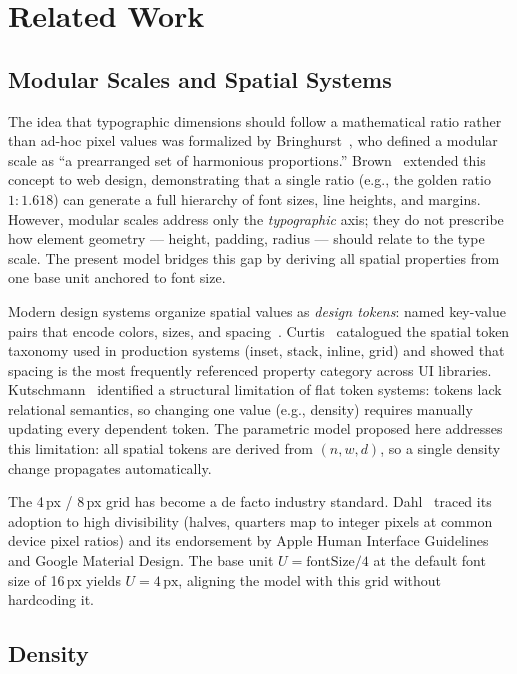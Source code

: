 \section{Related Work}
\label{sec:related-work}

\subsection{Modular Scales and Spatial Systems}

The idea that typographic dimensions should follow a mathematical ratio rather than ad-hoc pixel values was formalized by Bringhurst~\cite{bringhurst2012}, who defined a modular scale as ``a prearranged set of harmonious proportions.'' Brown~\cite{brown2011} extended this concept to web design, demonstrating that a single ratio (e.g., the golden ratio $1{:}1.618$) can generate a full hierarchy of font sizes, line heights, and margins. However, modular scales address only the \emph{typographic} axis; they do not prescribe how element geometry --- height, padding, radius --- should relate to the type scale. The present model bridges this gap by deriving all spatial properties from one base unit anchored to font size.

Modern design systems organize spatial values as \emph{design tokens}: named key-value pairs that encode colors, sizes, and spacing~\cite{w3cdt2025}. Curtis~\cite{curtis2016} catalogued the spatial token taxonomy used in production systems (inset, stack, inline, grid) and showed that spacing is the most frequently referenced property category across UI libraries. Kutschmann~\cite{kutschmann2024} identified a structural limitation of flat token systems: tokens lack relational semantics, so changing one value (e.g., density) requires manually updating every dependent token. The parametric model proposed here addresses this limitation: all spatial tokens are derived from $(n, w, d)$, so a single density change propagates automatically.

The 4\,px / 8\,px grid has become a de facto industry standard. Dahl~\cite{dahl2017} traced its adoption to high divisibility (halves, quarters map to integer pixels at common device pixel ratios) and its endorsement by Apple Human Interface Guidelines and Google Material Design. The base unit $U = \text{fontSize} / 4$ at the default font size of 16\,px yields $U = 4\,\text{px}$, aligning the model with this grid without hardcoding it.

\subsection{Density}

